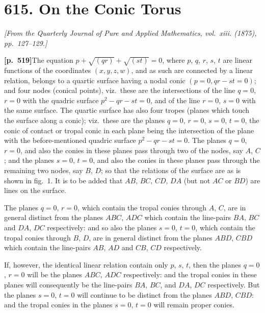 \documentclass[11pt,a4paper]{article}
\begin{document}
\newpage

\section*{\textbf{615.} On the Conic Torus}

\textit{[From the Quarterly Journal of Pure and Applied Mathematics, vol.~xiii. (1875), pp.~127--129.]}

\bigskip

\noindent\textbf{[p.~519]}\quad The equation $p + \sqrt{(qr)} + \sqrt{(st)} = 0$, where $p$, $q$, $r$, $s$, $t$ are linear functions of the coordinates $(x, y, z, w)$, and as such are connected by a linear relation, belongs to a quartic surface having a nodal conic $(p = 0, qr - st = 0)$; and four nodes (conical points), viz.\ these are the intersections of the line $q = 0$, $r = 0$ with the quadric surface $p^{2} - qr - st = 0$, and of the line $r = 0$, $s = 0$ with the same surface. The quartic surface has also four tropes (planes which touch the surface along a conic); viz.\ these are the planes $q = 0$, $r = 0$, $s = 0$, $t = 0$, the conic of contact or tropal conic in each plane being the intersection of the plane with the before-mentioned quadric surface $p^{2} - qr - st = 0$. The planes $q = 0$, $r = 0$, and also the conies in these planes pass through two of the nodes, say $A$, $C$; and the planes $s = 0$, $t = 0$, and also the conies in these planes pass through the remaining two nodes, say $B$, $D$; so that the relations of the surface are as is shown in fig.~1. It is to be added that $AB$, $BC$, $CD$, $DA$ (but not $AC$ or $BD$) are lines on the surface.

The planes $q = 0$, $r = 0$, which contain the tropal conies through $A$, $C$, are in general distinct from the planes $ABC$, $ADC$ which contain the line-pairs $BA$, $BC$ and $DA$, $DC$ respectively: and so also the planes $s = 0$, $t = 0$, which contain the tropal conies through $B$, $D$, are in general distinct from the planes $ABD$, $CBD$ which contain the line-pairs $AB$, $AD$ and $CB$, $CD$ respectively.

If, however, the identical linear relation contain only $p$, $s$, $t$, then the planes $q = 0$, $r = 0$ will be the planes $ABC$, $ADC$ respectively: and the tropal conies in these planes will consequently be the line-pairs $BA$, $BC$, and $DA$, $DC$ respectively. But the planes $s = 0$, $t = 0$ will continue to be distinct from the planes $ABD$, $CBD$: and the tropal conies in the planes $s = 0$, $t = 0$ will remain proper conies.
\end{document}
